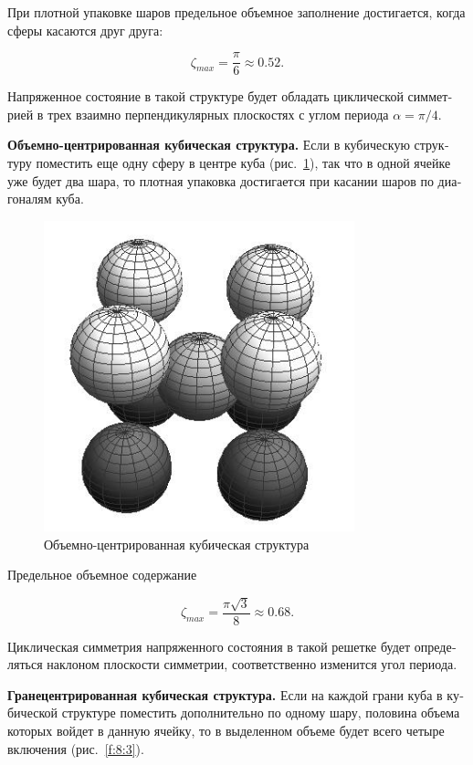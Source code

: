 \begin{russian}
При плотной упаковке шаров предельное объемное заполнение достигается, когда сферы касаются друг друга:

$$
\zeta_{max}=\frac{\pi}{6}\approx 0.52.
$$

Напряженное состояние в такой структуре будет обладать циклической симметрией в трех взаимно перпендикулярных плоскостях с углом периода $\alpha=\pi/4$.

\textbf{Объемно-центрированная кубическая структура.} Если в кубическую структуру поместить еще одну сферу в центре куба (рис.~\ref{f:8:2}), так что в одной ячейке уже будет два шара, то плотная упаковка достигается при касании шаров по диагоналям куба.{\sloppy\par}

\begin{figure}[h!]
\centering
\includegraphics[width=9cm]{cav-9.jpg}
\caption{Объемно-центрированная кубическая структура}
\label{f:8:2}
\end{figure}

Предельное объемное содержание

$$
\zeta_{max}=\frac{\pi\sqrt{3}}{8}\approx 0.68.
$$

Циклическая симметрия напряженного состояния в такой решетке будет определяться наклоном плоскости симметрии, соответственно изменится угол периода.

\textbf{Гранецентрированная кубическая структура.} Если на каждой грани куба в кубической структуре поместить дополнительно по одному шару, половина объема которых войдет в данную ячейку, то в выделенном объеме будет всего четыре включения (рис.~\ref{f:8:3}).


\end{russian}
